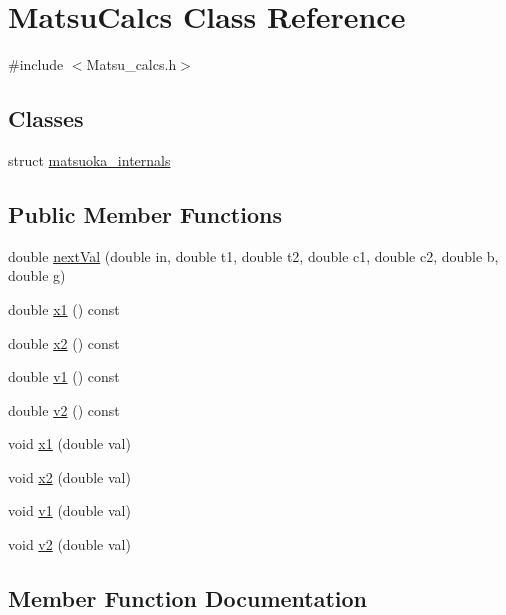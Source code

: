 \hypertarget{classMatsuCalcs}{}\section{Matsu\+Calcs Class Reference}
\label{classMatsuCalcs}


{\ttfamily \#include $<$Matsu\+\_\+calcs.\+h$>$}

\subsection*{Classes}
\begin{DoxyCompactItemize}
\item 
struct \mbox{\hyperlink{structMatsuCalcs_1_1matsuoka__internals}{matsuoka\+\_\+internals}}
\end{DoxyCompactItemize}
\subsection*{Public Member Functions}
\begin{DoxyCompactItemize}
\item 
double \mbox{\hyperlink{classMatsuCalcs_a4721b4e3d438299fa8467aa9ae95e2b7}{next\+Val}} (double in, double t1, double t2, double c1, double c2, double b, double g)
\item 
double \mbox{\hyperlink{classMatsuCalcs_a212b674e8650c992b634d97f516e5edd}{x1}} () const
\item 
double \mbox{\hyperlink{classMatsuCalcs_a527c4bf853224575c68e6f80082d42f6}{x2}} () const
\item 
double \mbox{\hyperlink{classMatsuCalcs_ae9deb8038e91c5cab82f1bbc808d1cc3}{v1}} () const
\item 
double \mbox{\hyperlink{classMatsuCalcs_a82af7633b9cbcc8143045f3e8e26ba18}{v2}} () const
\item 
void \mbox{\hyperlink{classMatsuCalcs_a4b5c02fd37cd1f400c7281b4a0a54c3d}{x1}} (double val)
\item 
void \mbox{\hyperlink{classMatsuCalcs_a7a8ad3e345dcb149244c7d1d84e9912c}{x2}} (double val)
\item 
void \mbox{\hyperlink{classMatsuCalcs_a09616bb8736d0de547f77cde66cb0050}{v1}} (double val)
\item 
void \mbox{\hyperlink{classMatsuCalcs_aafa56580a42b21f3b15c0170d9b2f2a6}{v2}} (double val)
\end{DoxyCompactItemize}


\subsection{Member Function Documentation}
\mbox{\label{classMatsuCalcs_a4721b4e3d438299fa8467aa9ae95e2b7}} 
